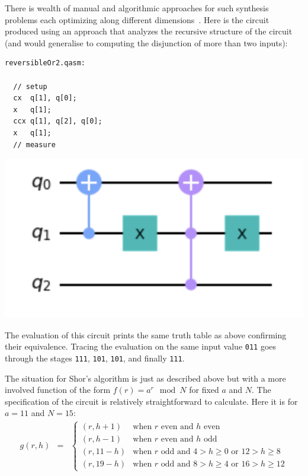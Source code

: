 There is wealth of manual and algorithmic approaches for such synthesis problems each optimizing along  different dimensions~\cite{maslov:2003:rls:1087512,1201583}. Here is the circuit produced using an approach that analyzes the recursive structure of the circuit (and would generalise to computing the disjunction of more than two inputs):

\begin{center}
  \begin{minipage}[c]{0.4\linewidth}
\begin{verbatim}
reversibleOr2.qasm:

  // setup
  cx  q[1], q[0];
  x   q[1];
  ccx q[1], q[2], q[0];
  x   q[1];
  // measure
  \end{verbatim}
  \end{minipage}
  \qquad
  \includegraphics[scale=0.7]{reversibleOr2.png}
\end{center}

\noindent The evaluation of this circuit prints the same truth table as above confirming their equivalence. Tracing the
evaluation on the same input value \verb|011| goes through the stages \verb|111|, \verb|101|, \verb|101|, and finally \verb|111|.

The situation for Shor's algorithm is just as described above but with a more involved function of the form $f(r) = a^{r} \mod N$ for fixed $a$ and $N$. The specification of the circuit is relatively straightforward to calculate. Here it is for $a=11$ and $N=15$:
\[\begin{array}{rcll}
g(r,h) &=& \left\{ \begin{array}{ll}
                     (r,h+1) & \mbox{when~$r$~even~and~$h$~even} \\
                     (r,h-1) & \mbox{when~$r$~even~and~$h$~odd} \\
                     (r,11-h) & \mbox{when~$r$~odd~and~$4 > h \geq 0$~or~$12 > h \geq 8$} \\
                     (r,19-h) & \mbox{when~$r$~odd~and~$8 > h \geq 4$~or~$16 > h \geq 12$}
                                \end{array}\right.
\end{array}\]

